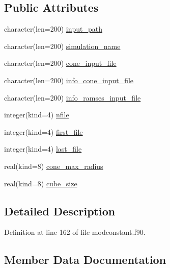 \subsection*{Public Attributes}
\begin{DoxyCompactItemize}
\item 
character(len=200) \hyperlink{structmodconstant_1_1type__parameter__conecreator_ac382f8cfe1347c4242bded522f3206df}{input\+\_\+path}
\item 
character(len=200) \hyperlink{structmodconstant_1_1type__parameter__conecreator_af7518143511653280193e1cd3ecacb8c}{simulation\+\_\+name}
\item 
character(len=200) \hyperlink{structmodconstant_1_1type__parameter__conecreator_a2bdd6648e859eb4c798e2298fe6647b1}{cone\+\_\+input\+\_\+file}
\item 
character(len=200) \hyperlink{structmodconstant_1_1type__parameter__conecreator_a5f8f89332e28a5774a6bc136b842cdd9}{info\+\_\+cone\+\_\+input\+\_\+file}
\item 
character(len=200) \hyperlink{structmodconstant_1_1type__parameter__conecreator_aa2e7ccb48f0190fad5e9900b5b1b4d63}{info\+\_\+ramses\+\_\+input\+\_\+file}
\item 
integer(kind=4) \hyperlink{structmodconstant_1_1type__parameter__conecreator_aed8367ffd7693e23e246b114eb3eef88}{nfile}
\item 
integer(kind=4) \hyperlink{structmodconstant_1_1type__parameter__conecreator_a2378ef5e20c6ff83414d69b9c19c0bbd}{first\+\_\+file}
\item 
integer(kind=4) \hyperlink{structmodconstant_1_1type__parameter__conecreator_a23caca71a8dc1b330de47e8a6873012e}{last\+\_\+file}
\item 
real(kind=8) \hyperlink{structmodconstant_1_1type__parameter__conecreator_a86915502305c5da4d6eec7273448f947}{cone\+\_\+max\+\_\+radius}
\item 
real(kind=8) \hyperlink{structmodconstant_1_1type__parameter__conecreator_a5123eeb98fd44cbe5ce7b83c97441108}{cube\+\_\+size}
\end{DoxyCompactItemize}


\subsection{Detailed Description}


Definition at line 162 of file modconstant.\+f90.



\subsection{Member Data Documentation}
